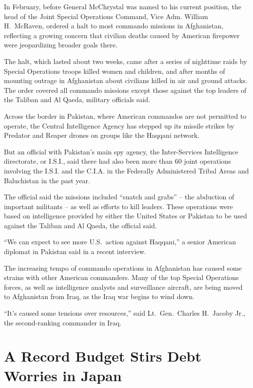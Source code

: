 ﻿\documentclass[12pt]{article}
\begin{document}
In February, before General McChrystal was named to his current position, the head of the Joint
Special Operations Command, Vice Adm. William H.~McRaven, ordered a halt to most commando missions
in Afghanistan, reflecting a growing concern that civilian deaths caused by American firepower were
jeopardizing broader goals there.

The halt, which lasted about two weeks, came after a series of nighttime raids by Special Operations
troops killed women and children, and after months of mounting outrage in Afghanistan about
civilians killed in air and ground attacks. The order covered all commando missions except those
against the top leaders of the Taliban and Al Qaeda, military officials said.

Across the border in Pakistan, where American commandos are not permitted to operate, the Central
Intelligence Agency has stepped up its missile strikes by Predator and Reaper drones on groups like
the Haqqani network.

But an official with Pakistan's main spy agency, the Inter-Services Intelligence directorate, or
I.S.I., said there had also been more than 60 joint operations involving the I.S.I. and the C.I.A.
in the Federally Administered Tribal Areas and Baluchistan in the past year.

The official said the missions included ``snatch and grabs'' -- the abduction of important militants
-- as well as efforts to kill leaders. These operations were based on intelligence provided by
either the United States or Pakistan to be used against the Taliban and Al Qaeda, the official said.

``We can expect to see more U.S.~action against Haqqani,'' a senior American diplomat in Pakistan
said in a recent interview.

The increasing tempo of commando operations in Afghanistan has caused some strains with other
American commanders. Many of the top Special Operations forces, as well as intelligence analysts and
surveillance aircraft, are being moved to Afghanistan from Iraq, as the Iraq war begins to wind
down.

``It's caused some tensions over resources,'' said Lt.~Gen.~Charles H.~Jacoby Jr., the
second-ranking commander in Iraq.

\section{A Record Budget Stirs Debt Worries in Japan}
\end{document}
